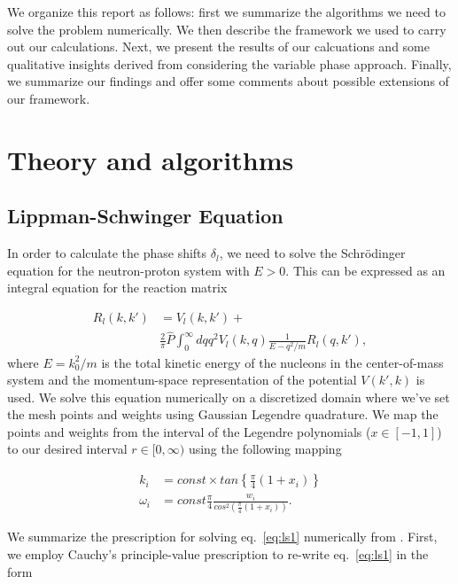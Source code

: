 \documentclass[10pt,showpacs,preprintnumbers,footinbib,amsmath,amssymb,aps,prl,twocolumn,groupedaddress,superscriptaddress,showkeys]{revtex4-1}
\begin{document}
We organize this report as follows: first we summarize the algorithms we need to solve the
problem numerically. We then describe the framework we used to carry out our calculations.
Next, we present the results of our calcuations and some qualitative insights derived from
considering the variable phase approach. Finally, we summarize our findings and offer some
comments about possible extensions of our framework.



\section{Theory and algorithms}\label{sec:theory}

\subsection{Lippman-Schwinger Equation}

In order to calculate the phase shifts $\delta_l$, we need to solve the Schr{\"o}dinger equation
for the neutron-proton system with $E > 0$. This can be expressed as an integral equation for
the reaction matrix

\begin{equation}
\begin{split}
    R_l(k,k') &= V_l(k,k') + \\
  &\frac{2}{\pi}\hat{P}
                \int_0^{\infty}dqq^2V_l(k,q)\frac{1}{E-q^2/m}R_l(q,k'),
   \label{eq:ls1}
\end{split}
\end{equation}
where $E = k _0 ^2 / m$ is the total kinetic energy of the nucleons in the center-of-mass
system and the momentum-space representation of the potential $V(k',k)$ is used. We solve this
equation numerically on a discretized domain where we've set the mesh points and
weights using Gaussian Legendre quadrature. We map the points and weights from the interval of
the Legendre polynomials ($x \in [-1,1]$) to our desired interval $r \in [0,\infty)$ using the
following mapping

\begin{align*}
          k_i&=const\times tan\left\{\frac{\pi}{4}(1+x_i)\right\} \\
          \omega_i&= const\frac{\pi}{4}\frac{w_i}{cos^2\left(\frac{\pi}{4}(1+x_i)\right)}.
\end{align*}

We summarize the prescription for solving eq.~\ref{eq:ls1} numerically from
\citet{lectureNotes}. First, we employ Cauchy's principle-value prescription
to re-write eq.~\ref{eq:ls1} in the form
\end{document}
